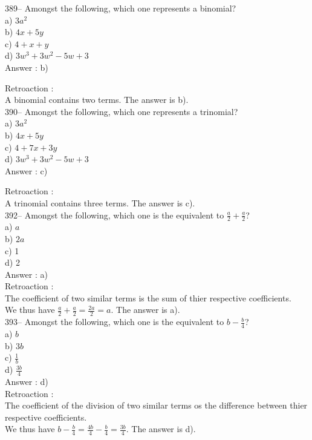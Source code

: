 ﻿\documentclass[letterpaper, 12pt]{article}
\begin{document}
389-- Amongst the following, which one represents a binomial?\\
a) $3a^{2}$\\
b) $4x+5y$\\
c) $4+x+y$\\
d) $3w^{3}+3w^{2}-5w+3$\\

Answer : b)

Retroaction : \\
A binomial contains two terms. The answer is b).\\

390-- Amongst the following, which one represents a trinomial?\\
a) $3a^{2}$\\
b) $4x+5y$\\
c) $4+7x+3y$\\
d) $3w^{3}+3w^{2}-5w+3$\\

Answer : c)

Retroaction : \\
A trinomial contains three terms. The answer is c).\\


392-- Amongst the following, which one is the equivalent to $\frac{a}{2}+\frac{a}{2}$?\\
a) $a$\\
b) $2a$\\
c) 1\\
d) 2\\

Answer : a)\\

Retroaction : \\
The coefficient of two similar terms is the sum of thier respective coefficients.\\[2mm]
We thus have $\frac{a}{2}+\frac{a}{2}=\frac{2a}{2}=a$.  The answer is a).\\

393-- Amongst the following, which one is the equivalent to $b-\frac{b}{4}$?\\
a) $b$\\[2mm]
b) $3b$\\[2mm]
c) $\frac{1}{b}$\\[2mm]
d) $\frac{3b}{4}$\\

Answer : d)\\

Retroaction : \\
The coefficient of the division of two similar terms os the difference between thier respective coefficients.\\[2mm]
We thus have $b-\frac{b}{4}=\frac{4b}{4}-\frac{b}{4}=\frac{3b}{4}$. The answer is d).\\
\end{document}
